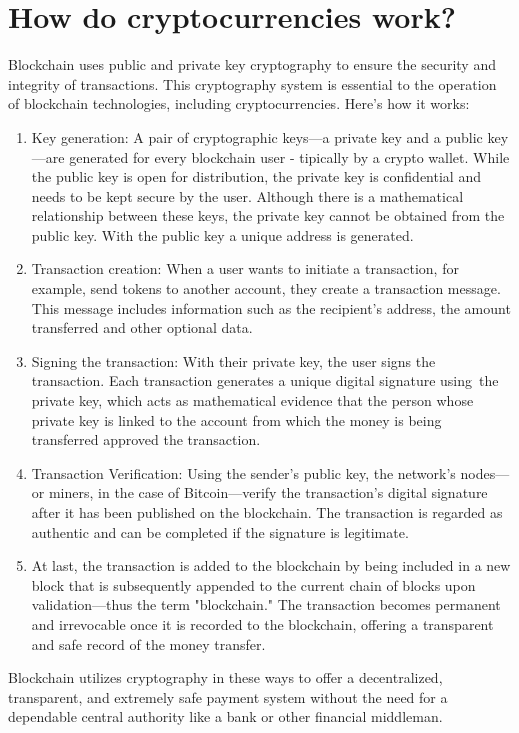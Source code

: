 \section{How do cryptocurrencies work?}
\label{sec:ch2sec2}
\par Blockchain uses public and private key cryptography to ensure the security and integrity of transactions. This cryptography system is essential to the operation of blockchain technologies, including cryptocurrencies. Here's how it works:
\begin{enumerate}
	\item Key generation: A pair of cryptographic keys—a private key and a public key—are generated for every blockchain user - tipically by a crypto wallet. While the public key is open for distribution, the private key is confidential and needs to be kept secure by the user. Although there is a mathematical relationship between these keys, the private key cannot be obtained from the public key. With the public key a unique address is generated.
	\item Transaction creation: When a user wants to initiate a transaction, for example, send tokens to another account, they create a transaction message. This message includes information such as the recipient's address, the amount transferred and other optional data.
	\item Signing the transaction: With their private key, the user signs the transaction. Each transaction generates a unique digital signature using the private key, which acts as mathematical evidence that the person whose private key is linked to the account from which the money is being transferred approved the transaction.
	\item Transaction Verification: Using the sender's public key, the network's nodes—or miners, in the case of Bitcoin—verify the transaction's digital signature after it has been published on the blockchain. The transaction is regarded as authentic and can be completed if the signature is legitimate.
	\item At last, the transaction is added to the blockchain by being included in a new block that is subsequently appended to the current chain of blocks upon validation—thus the term "blockchain." The transaction becomes permanent and irrevocable once it is recorded to the blockchain, offering a transparent and safe record of the money transfer.
\end{enumerate}
\par Blockchain utilizes cryptography in these ways to offer a decentralized, transparent, and extremely safe payment system without the need for a dependable central authority like a bank or other financial middleman.


